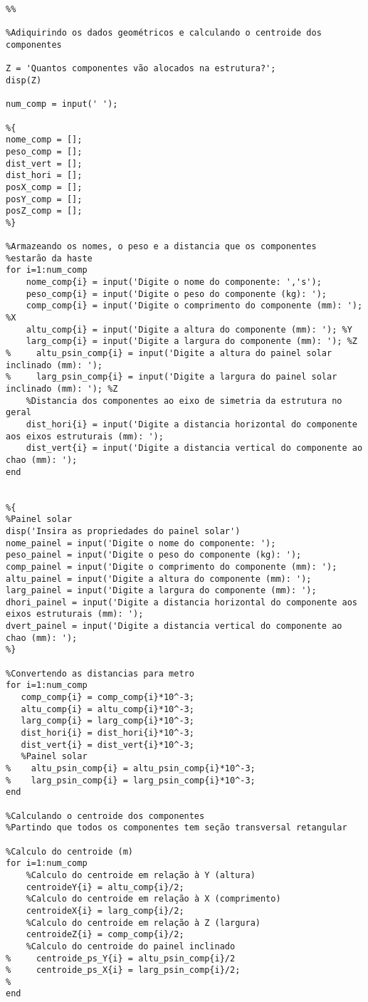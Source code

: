 \begin{anexosenv}
\begin{lstlisting}
%%

%Adiquirindo os dados geométricos e calculando o centroide dos componentes

Z = 'Quantos componentes vão alocados na estrutura?';
disp(Z)

num_comp = input(' ');

%{
nome_comp = [];
peso_comp = [];
dist_vert = [];
dist_hori = [];
posX_comp = [];
posY_comp = [];
posZ_comp = [];
%}

%Armazeando os nomes, o peso e a distancia que os componentes 
%estarão da haste
for i=1:num_comp
    nome_comp{i} = input('Digite o nome do componente: ','s');
    peso_comp{i} = input('Digite o peso do componente (kg): ');
    comp_comp{i} = input('Digite o comprimento do componente (mm): '); %X
    altu_comp{i} = input('Digite a altura do componente (mm): '); %Y
    larg_comp{i} = input('Digite a largura do componente (mm): '); %Z
%     altu_psin_comp{i} = input('Digite a altura do painel solar inclinado (mm): '); 
%     larg_psin_comp{i} = input('Digite a largura do painel solar inclinado (mm): '); %Z
    %Distancia dos componentes ao eixo de simetria da estrutura no geral
    dist_hori{i} = input('Digite a distancia horizontal do componente aos eixos estruturais (mm): ');
    dist_vert{i} = input('Digite a distancia vertical do componente ao chao (mm): '); 
end


%{
%Painel solar
disp('Insira as propriedades do painel solar')
nome_painel = input('Digite o nome do componente: ');
peso_painel = input('Digite o peso do componente (kg): ');
comp_painel = input('Digite o comprimento do componente (mm): ');
altu_painel = input('Digite a altura do componente (mm): ');
larg_painel = input('Digite a largura do componente (mm): ');
dhori_painel = input('Digite a distancia horizontal do componente aos eixos estruturais (mm): ');
dvert_painel = input('Digite a distancia vertical do componente ao chao (mm): ');
%}

%Convertendo as distancias para metro
for i=1:num_comp
   comp_comp{i} = comp_comp{i}*10^-3;
   altu_comp{i} = altu_comp{i}*10^-3;
   larg_comp{i} = larg_comp{i}*10^-3;
   dist_hori{i} = dist_hori{i}*10^-3;
   dist_vert{i} = dist_vert{i}*10^-3;
   %Painel solar
%    altu_psin_comp{i} = altu_psin_comp{i}*10^-3; 
%    larg_psin_comp{i} = larg_psin_comp{i}*10^-3;
end

%Calculando o centroide dos componentes
%Partindo que todos os componentes tem seção transversal retangular

%Calculo do centroide (m)
for i=1:num_comp
    %Calculo do centroide em relação à Y (altura)
    centroideY{i} = altu_comp{i}/2;
    %Calculo do centroide em relação à X (comprimento)
    centroideX{i} = larg_comp{i}/2;
    %Calculo do centroide em relação à Z (largura)
    centroideZ{i} = comp_comp{i}/2;
    %Calculo do centroide do painel inclinado
%     centroide_ps_Y{i} = altu_psin_comp{i}/2
%     centroide_ps_X{i} = larg_psin_comp{i}/2;
%     
end


\end{lstlisting}
\end{anexosenv}
